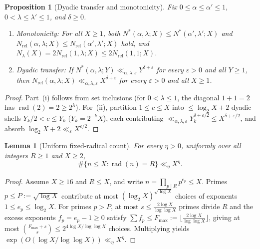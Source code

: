 \documentclass[11pt,a4paper]{amsart}
\theoremstyle{plain}
\newtheorem{proposition}[theorem]{Proposition}
\newtheorem{lemma}[theorem]{Lemma}
\theoremstyle{definition}
\theoremstyle{remark}
\DeclareMathOperator{\rad}{rad}
\newcommand{\eps}{\varepsilon}
\begin{document}
\begin{proposition}[Dyadic transfer and monotonicity]\label{prop:dyadic}
Fix $0 \le \alpha \le \alpha' \le 1$, $0 < \lambda \le \lambda' \le 1$, and $\delta \ge 0$.
\begin{enumerate}[label=(\roman*)]
\item \emph{Monotonicity:} For all $X \ge 1$, both $N^*(\alpha,\lambda;X) \le N^*(\alpha',\lambda';X)$ and $N_{\mathrm{rel}}(\alpha,\lambda;X) \le N_{\mathrm{rel}}(\alpha',\lambda';X)$ hold, and $N_\lambda(X) = 2 N_{\mathrm{rel}}(1,\lambda;X) \le 2 N_{\mathrm{rel}}(1,1;X)$.
\item \emph{Dyadic transfer:} If $N^*(\alpha,\lambda;Y) \ll_{\alpha,\lambda,\eps} Y^{\delta+\eps}$ for every $\eps > 0$ and all $Y \ge 1$, then $N_{\mathrm{rel}}(\alpha,\lambda;X) \ll_{\alpha,\lambda,\eps} X^{\delta+\eps}$ for every $\eps > 0$ and all $X \ge 1$.
\end{enumerate}
\end{proposition}
\begin{proof}
Part~(i) follows from set inclusions (for $0 < \lambda \le 1$, the diagonal $1+1=2$ has $\rad(2)=2 \ge 2^\lambda$). For~(ii), partition $1 \le c \le X$ into $\le \log_2 X + 2$ dyadic shells $Y_k/2 < c \le Y_k$ ($Y_k = 2^{-k}X$), each contributing $\ll_{\alpha,\lambda,\eps} Y_k^{\delta+\eps/2} \le X^{\delta+\eps/2}$, and absorb $\log_2 X + 2 \ll_\eps X^{\eps/2}$.
\end{proof}

\begin{lemma}[Uniform fixed-radical count]\label{lem:fixed_rad}
For every $\eta > 0$, uniformly over all integers $R \ge 1$ and $X \ge 2$,
\[
  \#\{n \le X : \rad(n) = R\} \ll_\eta X^\eta.
\]
\end{lemma}
\begin{proof}
Assume $X \ge 16$ and $R \le X$, and write $n = \prod_{p \mid R} p^{e_p} \le X$. Primes $p \le P := \sqrt{\log X}$ contribute at most $(\log_2 X)^{\sqrt{\log X}}$ choices of exponents $1 \le e_p \le \log_2 X$. For primes $p > P$, at most $s \le \frac{2\log X}{\log\log X}$ primes divide $R$ and the excess exponents $f_p = e_p - 1 \ge 0$ satisfy $\sum f_p \le F_{\max} := \lfloor \frac{2\log X}{\log\log X}\rfloor$, giving at most $\binom{F_{\max}+s}{s} \le 2^{4\log X / \log\log X}$ choices. Multiplying yields $\exp(O(\log X / \log\log X)) \ll_\eta X^\eta$.
\end{proof}
\end{document}
